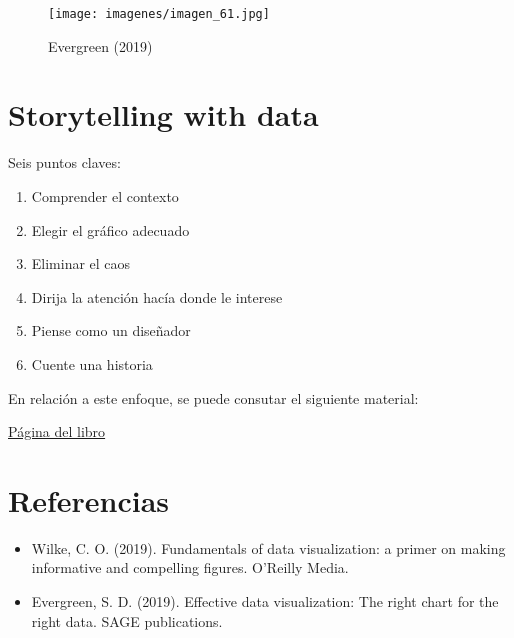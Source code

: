 \documentclass[
  letterpaper,
  DIV=11,
  numbers=noendperiod]{scrartcl}
\providecommand{\tightlist}{%
  \setlength{\itemsep}{0pt}\setlength{\parskip}{0pt}}\usepackage{longtable,booktabs,array}
\begin{document}
\begin{figure}[H]

{\centering \texttt{[image: imagenes/imagen\_61.jpg]}

}

\caption{Evergreen (2019)}

\end{figure}

\hypertarget{storytelling-with-data}{%
\section{Storytelling with data}\label{storytelling-with-data}}

Seis puntos claves:

\begin{enumerate}
\def\labelenumi{\arabic{enumi}.}
\tightlist
\item
  Comprender el contexto
\item
  Elegir el gráfico adecuado
\item
  Eliminar el caos
\item
  Dirija la atención hacía donde le interese
\item
  Piense como un diseñador
\item
  Cuente una historia
\end{enumerate}

En relación a este enfoque, se puede consutar el siguiente material:

\href{https://www.storytellingwithdata.com}{Página del libro}

\hypertarget{referencias}{%
\section{Referencias}\label{referencias}}

\begin{itemize}
\item
  Wilke, C. O. (2019). Fundamentals of data visualization: a primer on
  making informative and compelling figures. O'Reilly Media.
\item
  Evergreen, S. D. (2019). Effective data visualization: The right chart
  for the right data. SAGE publications.
\end{itemize}
\end{document}
